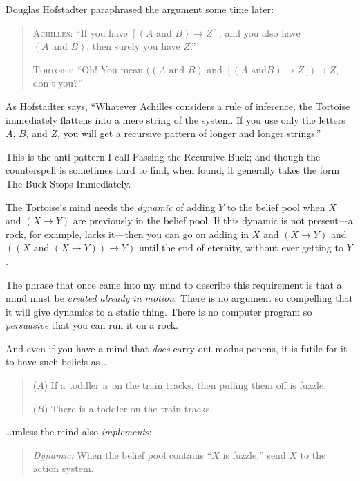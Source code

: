  Douglas Hofstadter paraphrased the argument some time later:

\begin{quotation}

 \textsc{Achilles}: ``If you have $[(A\text{ and }B) \rightarrow 
Z]$, and you also have $(A\text{ and }B)$, then surely you have
$Z$.''

{
 \textsc{Tortoise}: ``Oh! You mean $((A\text{ and }B)$ and $[(A\text{ and
}B) \rightarrow  Z]) \rightarrow  Z$, don't
 you?''}
\end{quotation}


 As Hofstadter says, ``Whatever Achilles considers
a rule of inference, the Tortoise immediately flattens into a mere
string of the system. If you use only the letters $A$, $B$, and $Z$, you will
get a recursive pattern of longer and longer
strings.''


 This is the anti-pattern I call Passing the Recursive Buck; and
though the counterspell is sometimes hard to find, when found, it
generally takes the form The Buck Stops Immediately.


 The Tortoise's mind needs the \textit{dynamic} of
adding $Y$ to the belief pool when $X$ and $(X \rightarrow Y)$ are
previously in the belief pool. If this dynamic is not present---a rock,
for example, lacks it---then you can go on adding in $X$ and $(X
\rightarrow  Y)$ and $((X\text{ and }(X \rightarrow  Y)) \rightarrow  Y)$
until the end of eternity, without ever getting to $Y$.


 The phrase that once came into my mind to describe this
requirement is that a mind must be \textit{created already in motion.}
There is no argument so compelling that it will give dynamics to a
static thing. There is no computer program so \textit{persuasive} that
you can run it on a rock.


 And even if you have a mind that \textit{does} carry out modus
ponens, it is futile for it to have such beliefs as\,\ldots

\begin{quotation}

 ($A$) If a toddler is on the train tracks, then pulling them off is
fuzzle.

{
  ($B$) There is a toddler on the train tracks.}
\end{quotation}


 \ldots unless the mind also \textit{implements}:

\begin{quotation}
{
 \textit{Dynamic:} When the belief pool contains
``$X$ is fuzzle,'' send $X$ to the
 action system.}
\end{quotation}


